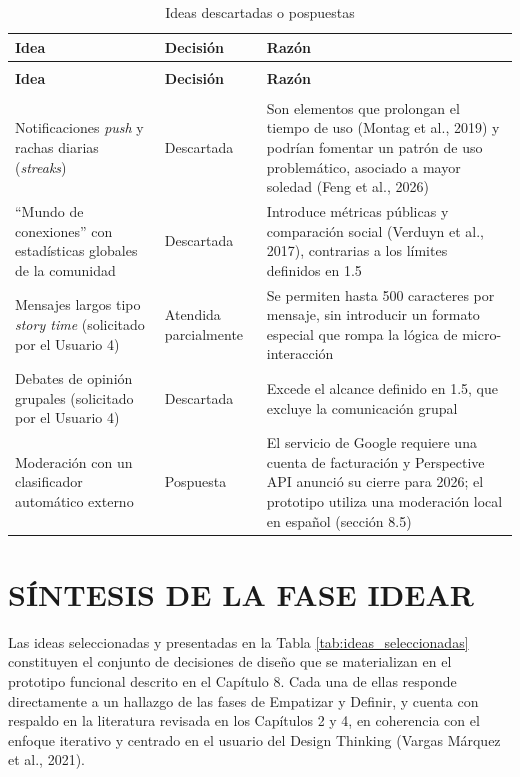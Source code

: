 \begin{longtable}{
  >{\raggedright\arraybackslash}p{}
  >{\raggedright\arraybackslash}p{}
  >{\raggedright\arraybackslash}p{}
}
\caption{Ideas descartadas o pospuestas}\label{tab:ideas_descartadas}\\
\toprule
\textbf{Idea} & \textbf{Decisión} & \textbf{Razón} \\
\midrule
\endfirsthead

\multicolumn{3}{l}{\textit{Tabla \thetable{} (continuación)}} \\[4pt]
\toprule
\textbf{Idea} & \textbf{Decisión} & \textbf{Razón} \\
\midrule
\endhead

\midrule
\multicolumn{3}{r}{\textit{Continúa en la siguiente página}} \\
\endfoot

\bottomrule
\endlastfoot
Notificaciones \textit{push} y rachas diarias (\textit{streaks}) & Descartada & Son elementos que prolongan el tiempo de uso (Montag et al., 2019) y podrían fomentar un patrón de uso problemático, asociado a mayor soledad (Feng et al., 2026) \\[6pt]
``Mundo de conexiones'' con estadísticas globales de la comunidad & Descartada & Introduce métricas públicas y comparación social (Verduyn et al., 2017), contrarias a los límites definidos en 1.5 \\[6pt]
Mensajes largos tipo \textit{story time} (solicitado por el Usuario 4) & Atendida parcialmente & Se permiten hasta 500 caracteres por mensaje, sin introducir un formato especial que rompa la lógica de micro-interacción \\[6pt]
Debates de opinión grupales (solicitado por el Usuario 4) & Descartada & Excede el alcance definido en 1.5, que excluye la comunicación grupal \\[6pt]
Moderación con un clasificador automático externo & Pospuesta & El servicio de Google requiere una cuenta de facturación y Perspective API anunció su cierre para 2026; el prototipo utiliza una moderación local en español (sección 8.5) \\[6pt]

\end{longtable}

\section{SÍNTESIS DE LA FASE IDEAR}
Las ideas seleccionadas y presentadas en la Tabla \ref{tab:ideas_seleccionadas} constituyen el conjunto de decisiones de diseño que se materializan en el prototipo funcional descrito en el Capítulo 8. Cada una de ellas responde directamente a un hallazgo de las fases de Empatizar y Definir, y cuenta con respaldo en la literatura revisada en los Capítulos 2 y 4, en coherencia con el enfoque iterativo y centrado en el usuario del Design Thinking (Vargas Márquez et al., 2021).